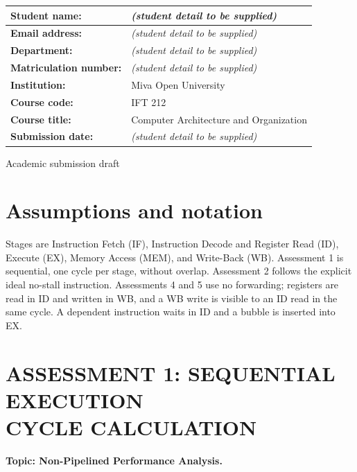\documentclass[11pt,letterpaper]{article}
\newcommand{\blank}{\textit{(student detail to be supplied)}}
\begin{document}
\begin{titlepage}\centering\vspace*{1in}{\Large MIVA OPEN UNIVERSITY\par}\vspace{.4in}{\Large Lab Assessment Solutions\par}\vspace{.8in}
\begin{tabular}{|l|l|}\hline\textbf{Student name:}&\blank\\\hline\textbf{Email address:}&\blank\\\hline\textbf{Department:}&\blank\\\hline\textbf{Matriculation number:}&\blank\\\hline\textbf{Institution:}&Miva Open University\\\hline\textbf{Course code:}&IFT 212\\\hline\textbf{Course title:}&Computer Architecture and Organization\\\hline\textbf{Submission date:}&\blank\\\hline\end{tabular}\vfill Academic submission draft\end{titlepage}
\hypersetup{pageanchor=true}
\tableofcontents\clearpage{}
\section*{Assumptions and notation}
Stages are Instruction Fetch (IF), Instruction Decode and Register Read (ID), Execute (EX), Memory Access (MEM), and Write-Back (WB). Assessment 1 is sequential, one cycle per stage, without overlap. Assessment 2 follows the explicit ideal no-stall instruction. Assessments 4 and 5 use no forwarding; registers are read in ID and written in WB, and a WB write is visible to an ID read in the same cycle. A dependent instruction waits in ID and a bubble is inserted into EX.

\section[ASSESSMENT 1: SEQUENTIAL EXECUTION CYCLE CALCULATION]{ASSESSMENT 1: SEQUENTIAL EXECUTION\\CYCLE CALCULATION}
\textbf{Topic: Non-Pipelined Performance Analysis.}
\end{document}
